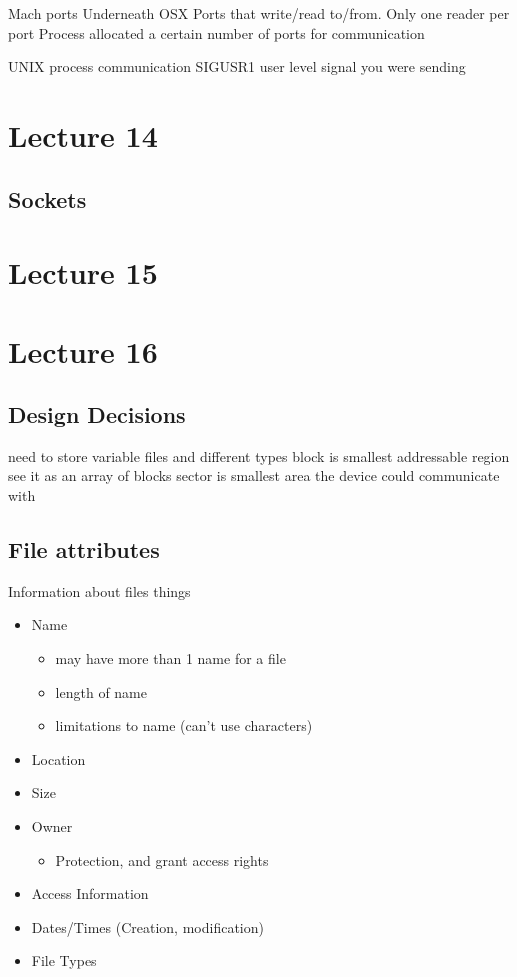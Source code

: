 \documentclass{article}
\begin{document}
		Mach ports
			Underneath OSX
			Ports that write/read to/from.
			Only one reader per port
			Process allocated a certain number of ports for communication

		UNIX process communication
			SIGUSR1		user level signal you were sending

\section{Lecture 14}
	\subsection{Sockets}

\section{Lecture 15}

\section{Lecture 16}
	\subsection{Design Decisions}
		need to store variable files and different types
		block is smallest addressable region
			see it as an array of blocks
		sector is smallest area the device could communicate with

	\subsection{File attributes}
		Information about files
		things
		\begin{itemize}
			\item Name 
			\begin{itemize}
				\item may have more than 1 name for a file
				\item length of name
				\item limitations to name (can't use characters) 
			\end{itemize}
			\item Location
			\item Size
			\item Owner
			\begin{itemize}
				\item Protection, and grant access rights
			\end{itemize}
			\item Access Information
			\item Dates/Times (Creation, modification)
			\item File Types
		\end{itemize}
			
\end{document}
